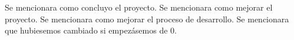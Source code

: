 \documentclass{../../prgrado}
\begin{document}
Se mencionara como concluyo el proyecto.
Se mencionara como mejorar el proyecto.
Se mencionara como mejorar el proceso de desarrollo.
Se mencionara que hubiesemos cambiado si empezásemos de 0.



{ %

\backmatter %


\newpage



} %

\end{document}
